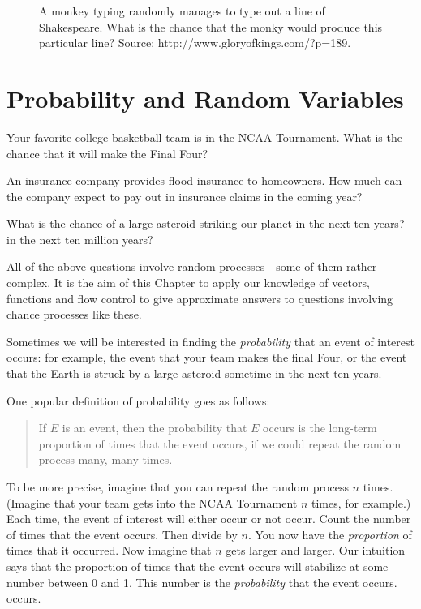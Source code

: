 \documentclass[]{book}
\theoremstyle{definition}
\theoremstyle{definition}
\theoremstyle{remark}
\begin{document}
{\begin{figure}[!h]
{}

\caption{A monkey typing randomly manages to type out a line of Shakespeare.  What is the chance that the monky would produce this particular line?  Source: http://www.gloryofkings.com/?p=189.}\label{fig:monkey-typewriter}
\end{figure}

\newpage

\section{Probability and Random
Variables}\label{probability-and-random-variables}

Your favorite college basketball team is in the NCAA Tournament. What is
the chance that it will make the Final Four?

An insurance company provides flood insurance to homeowners. How much
can the company expect to pay out in insurance claims in the coming
year?

What is the chance of a large asteroid striking our planet in the next
ten years? in the next ten million years?

All of the above questions involve random processes---some of them
rather complex. It is the aim of this Chapter to apply our knowledge of
vectors, functions and flow control to give approximate answers to
questions involving chance processes like these.

Sometimes we will be interested in finding the \emph{probability} that
an event of interest occurs: for example, the event that your team makes
the final Four, or the event that the Earth is struck by a large
asteroid sometime in the next ten years.

One popular definition of probability goes as
follows:

\begin{quote}
If \(E\) is an event, then the probability that \(E\) occurs is the
long-term proportion of times that the event occurs, if we could repeat
the random process many, many times.
\end{quote}

To be more precise, imagine that you can repeat the random process \(n\)
times. (Imagine that your team gets into the NCAA Tournament \(n\)
times, for example.) Each time, the event of interest will either occur
or not occur. Count the number of times that the event occurs. Then
divide by \(n\). You now have the \emph{proportion} of times that it
occurred. Now imagine that \(n\) gets larger and larger. Our intuition
says that the proportion of times that the event occurs will stabilize
at some number between 0 and 1. This number is the \emph{probability}
that the event occurs. occurs.

}
\end{document}
